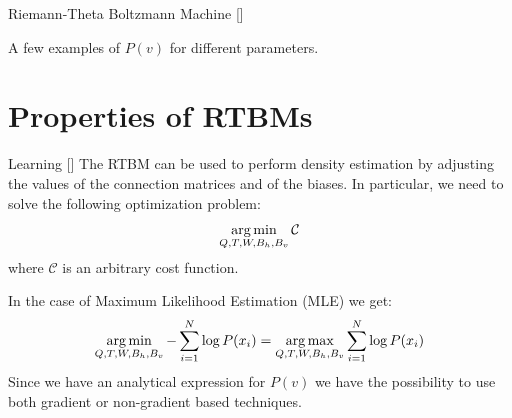 \documentclass[10pt]{beamer}
\begin{document}
\begin{frame}{Riemann-Theta Boltzmann Machine \hfill \small [\cite{2020}]}
\begin{figure}
\begin{center}
        \end{center}
        \end{figure}
        \begin{center}
            A few examples of $P(v)$ for different parameters.
        \end{center}
       
\end{frame}

\section{Properties of RTBMs}

\begin{frame}{Learning \hfill \small [\cite{2020}]}
    The RTBM can be used to perform density estimation by adjusting the values of the connection matrices and of the biases.
    In particular, we need to solve the following optimization problem:
    \begin{equation*}
        \operatorname*{arg\,min}_{Q,T,W,B_h,B_v} \mathcal{C}
    \end{equation*} 
    where $\mathcal{C}$ is an arbitrary cost function. 

    In the case of Maximum Likelihood Estimation (MLE) we get:
    \begin{equation*}
        \operatorname*{arg\,min}_{Q,T,W,B_h,B_v} - \sum_{i=1}^N \log  P(x_i) = \operatorname*{arg\,max}_{Q,T,W,B_h,B_v} \sum_{i=1}^N \log P(x_i)
    \end{equation*} 
    Since we have an analytical expression for $P(v)$ we have the possibility to use both
    gradient or non-gradient based techniques.


\end{frame}
\end{document}
